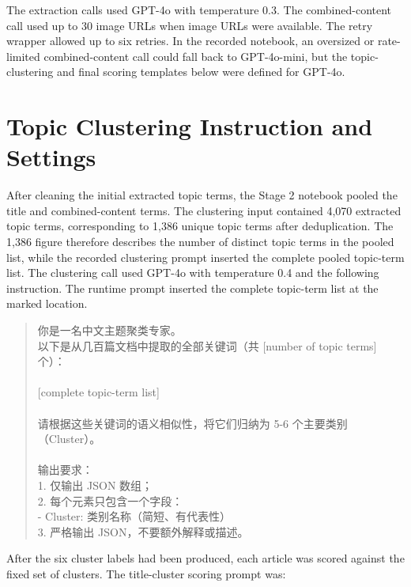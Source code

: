 The extraction calls used GPT-4o with temperature 0.3. The combined-content call used up to 30 image URLs when image URLs were available. The retry wrapper allowed up to six retries. In the recorded notebook, an oversized or rate-limited combined-content call could fall back to GPT-4o-mini, but the topic-clustering and final scoring templates below were defined for GPT-4o.

\section{Topic Clustering Instruction and Settings}
\label{app:a-topic-clustering-settings}

After cleaning the initial extracted topic terms, the Stage 2 notebook pooled the title and combined-content terms. The clustering input contained 4,070 extracted topic terms, corresponding to 1,386 unique topic terms after deduplication. The 1,386 figure therefore describes the number of distinct topic terms in the pooled list, while the recorded clustering prompt inserted the complete pooled topic-term list. The clustering call used GPT-4o with temperature 0.4 and the following instruction. The runtime prompt inserted the complete topic-term list at the marked location.

\begin{quote}
\small
{}
{\cjkfont
你是一名中文主题聚类专家。\\
以下是从几百篇文档中提取的全部关键词（共 [number of topic terms] 个）：\\
\\
{[complete topic-term list]}\\
\\
请根据这些关键词的语义相似性，将它们归纳为 5-6 个主要类别（Cluster）。\\
\\
输出要求：\\
1. 仅输出 JSON 数组；\\
2. 每个元素只包含一个字段：\\
\quad - Cluster: 类别名称（简短、有代表性）\\
3. 严格输出 JSON，不要额外解释或描述。
}
\end{quote}

After the six cluster labels had been produced, each article was scored against the fixed set of clusters. The title-cluster scoring prompt was:

